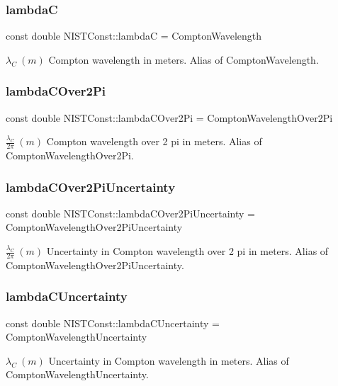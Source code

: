 \subsubsection{\texorpdfstring{lambdaC}{lambdaC}}
{\footnotesize\ttfamily const double N\+I\+S\+T\+Const\+::lambdaC = Compton\+Wavelength}

$\lambda_C \ (m)$ Compton wavelength in meters. Alias of Compton\+Wavelength. \mbox{\label{group___n_i_s_t_const-_compton_wavelength_gadaf3906a9db23eece3ac4e130978a8ce}} 
\subsubsection{\texorpdfstring{lambda\+C\+Over2\+Pi}{lambdaCOver2Pi}}
{\footnotesize\ttfamily const double N\+I\+S\+T\+Const\+::lambda\+C\+Over2\+Pi = Compton\+Wavelength\+Over2\+Pi}

$\frac{\lambda_C}{2\pi} \ (m)$ Compton wavelength over 2 pi in meters. Alias of Compton\+Wavelength\+Over2\+Pi. \mbox{\label{group___n_i_s_t_const-_compton_wavelength_ga6e5779d1afe643df1e5c28e97cfaf957}} 
\subsubsection{\texorpdfstring{lambda\+C\+Over2\+Pi\+Uncertainty}{lambdaCOver2PiUncertainty}}
{\footnotesize\ttfamily const double N\+I\+S\+T\+Const\+::lambda\+C\+Over2\+Pi\+Uncertainty = Compton\+Wavelength\+Over2\+Pi\+Uncertainty}

$\frac{\lambda_C}{2\pi} \ (m)$ Uncertainty in Compton wavelength over 2 pi in meters. Alias of Compton\+Wavelength\+Over2\+Pi\+Uncertainty. \mbox{\label{group___n_i_s_t_const-_compton_wavelength_ga5de8d927be86c65e9e7d78f2c399cc49}} 
\subsubsection{\texorpdfstring{lambda\+C\+Uncertainty}{lambdaCUncertainty}}
{\footnotesize\ttfamily const double N\+I\+S\+T\+Const\+::lambda\+C\+Uncertainty = Compton\+Wavelength\+Uncertainty}

$\lambda_C \ (m)$ Uncertainty in Compton wavelength in meters. Alias of Compton\+Wavelength\+Uncertainty. 